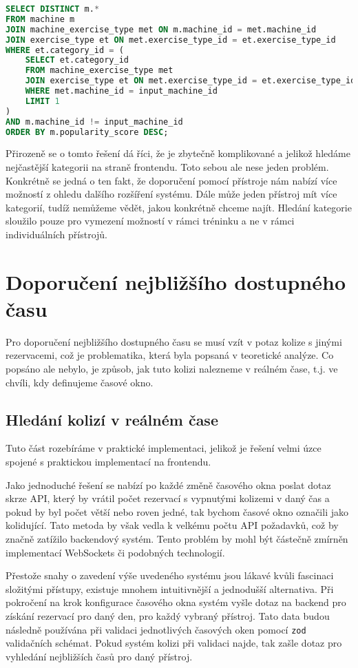 \begin{lstlisting}[language=SQL]
SELECT DISTINCT m.*
FROM machine m
JOIN machine_exercise_type met ON m.machine_id = met.machine_id
JOIN exercise_type et ON met.exercise_type_id = et.exercise_type_id
WHERE et.category_id = (
    SELECT et.category_id
    FROM machine_exercise_type met
    JOIN exercise_type et ON met.exercise_type_id = et.exercise_type_id
    WHERE met.machine_id = input_machine_id
    LIMIT 1
)
AND m.machine_id != input_machine_id
ORDER BY m.popularity_score DESC;
\end{lstlisting}
Přirozeně se o tomto řešení dá říci, že je zbytečně komplikované a jelikož hledáme nejčastější kategorii na straně frontendu. Toto sebou ale nese jeden problém. Konkrétně se jedná o ten fakt, že doporučení pomocí přístroje nám nabízí více možností z ohledu dalšího rozšíření systému. Dále může jeden přístroj mít více kategorií, tudíž nemůžeme vědět, jakou konkrétně chceme najít. Hledání kategorie sloužilo pouze pro vymezení možností v rámci tréninku a ne v rámci individuálních přístrojů.

\section{Doporučení nejbližšího dostupného času}

Pro doporučení nejbližšího dostupného času se musí vzít v potaz kolize s jinými rezervacemi, což je problematika, která byla popsaná v teoretické analýze. Co popsáno ale nebylo, je způsob, jak tuto kolizi nalezneme v reálném čase, t.j. ve chvíli, kdy definujeme časové okno.

\subsection{Hledání kolizí v reálném čase}
Tuto část rozebíráme v praktické implementaci, jelikož je řešení velmi úzce spojené s praktickou implementací na frontendu. 

Jako jednoduché řešení se nabízí po každé změně časového okna poslat dotaz skrze API, který by vrátil počet rezervací s vypnutými kolizemi v daný čas a pokud by byl počet větší nebo roven jedné, tak bychom časové okno označili jako kolidující. Tato metoda by však vedla k velkému počtu API požadavků, což by značně zatížilo backendový systém. Tento problém by mohl být částečně zmírněn implementací WebSockets či podobných technologií.

Přestože snahy o zavedení výše uvedeného systému jsou lákavé kvůli fascinaci složitými přístupy, existuje mnohem intuitivnější a jednodušší alternativa. Při pokročení na krok konfigurace časového okna systém vyšle dotaz na backend pro získání rezervací pro daný den, pro každý vybraný přístroj. Tato data budou následně používána při validaci jednotlivých časových oken pomocí \texttt{zod} validačních schémat. Pokud systém kolizi při validaci najde, tak zašle dotaz pro vyhledání nejbližších časů pro daný přístroj.


